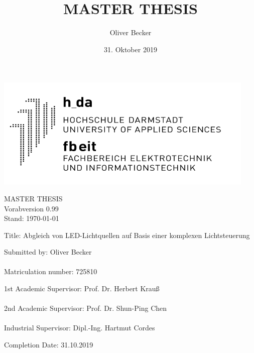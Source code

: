 \documentclass[11pt]{scrartcl}
\title{MASTER THESIS}
\author{Oliver Becker}
\date{31. Oktober 2019} %
\begin{document}
\par\vspace{-1cm}
\begin{flushright}
    \includegraphics[width=0.4\linewidth]{images/logo.png}
\end{flushright}
\vspace{1cm}\noindent
\begin{center}
    \huge MASTER THESIS\\
    \huge \color{red} Vorabversion 0.99\\
    \large Stand: \today
\end{center}
\vspace{1cm}\noindent
{\large Title:  Abgleich von LED-Lichtquellen auf Basis einer komplexen Lichtsteuerung}
\par\vspace{3cm}\noindent
Submitted by: \hspace{2cm}             Oliver Becker\\
\\
Matriculation number:  \hspace{.6cm}   725810\\
\par\vspace{2cm}\noindent
1st Academic Supervisor: \hspace{.2cm} Prof. Dr. Herbert Krauß\\
\\
2nd Academic Supervisor: \hspace{.05cm} Prof. Dr. Shun-Ping Chen\\
\\
Industrial Supervisor:   \hspace{.75cm} Dipl.-Ing. Hartmut Cordes\\
\par\vspace{2cm}\noindent
Completion Date: \hspace{1.5cm}         31.10.2019
\clearpage
\end{document}
